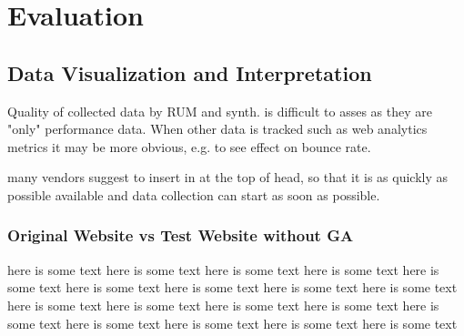 \chapter{Evaluation}
















\section{Data Visualization and Interpretation}




Quality of collected data by RUM and synth. is difficult to asses as they are "only" performance data.
When other data is tracked such as web analytics metrics it may be more obvious, e.g. to see effect on bounce rate.

many vendors suggest to insert in at the top of head, so that it is as quickly as possible available and data collection can start as soon as possible.






\subsection{Original Website vs Test Website without GA}

here is some text here is some text here is some text here is some text here is some text here is some text 
here is some text here is some text here is some text here is some text here is some text here is some text 
here is some text here is some text here is some text here is some text here is some text here is some text 

